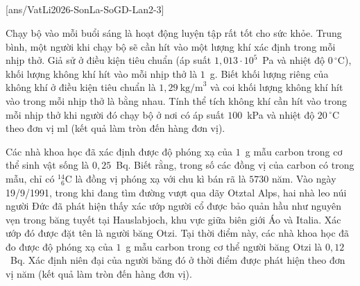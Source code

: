 	\subsection*{}
	\setcounter{ex}{0}
	[ans/VatLi2026-SonLa-SoGD-Lan2-3]

	\begin{ex}%
		Chạy bộ vào mỗi buổi sáng là hoạt động luyện tập rất tốt cho sức khỏe. Trung bình, một người khi chạy bộ sẽ cần hít vào một lượng khí xác định trong mỗi nhịp thở. Giả sử ở điều kiện tiêu chuẩn (áp suất $1{,}013\cdot 10^5$~Pa và nhiệt độ $0\,^\circ\text{C}$), khối lượng không khí hít vào mỗi nhịp thở là $1$~g. Biết khối lượng riêng của không khí ở điều kiện tiêu chuẩn là $1{,}29~\text{kg/m}^3$ và coi khối lượng không khí hít vào trong mỗi nhịp thở là bằng nhau. Tính thể tích không khí cần hít vào trong mỗi nhịp thở khi người đó chạy bộ ở nơi có áp suất $100$~kPa và nhiệt độ $20\,^\circ\text{C}$ theo đơn vị ml (kết quả làm tròn đến hàng đơn vị).
		\par
	\end{ex}

	\begin{ex}%
		Các nhà khoa học đã xác định được độ phóng xạ của $1$~g mẫu carbon trong cơ thể sinh vật sống là $0{,}25$~Bq. Biết rằng, trong số các đồng vị của carbon có trong mẫu, chỉ có ${}^{14}_{\phantom{1}6}\text{C}$ là đồng vị phóng xạ với chu kì bán rã là $5730$ năm. Vào ngày 19/9/1991, trong khi đang tìm đường vượt qua dãy Otztal Alps, hai nhà leo núi người Đức đã phát hiện thấy xác ướp người cổ được bảo quản hầu như nguyên vẹn trong băng tuyết tại Hauslabjoch, khu vực giữa biên giới Áo và Italia. Xác ướp đó được đặt tên là người băng Otzi. Tại thời điểm này, các nhà khoa học đã đo được độ phóng xạ của $1$~g mẫu carbon trong cơ thể người băng Otzi là $0{,}12$~Bq. Xác định niên đại của người băng đó ở thời điểm được phát hiện theo đơn vị năm (kết quả làm tròn đến hàng đơn vị).
		\par
	\end{ex}

